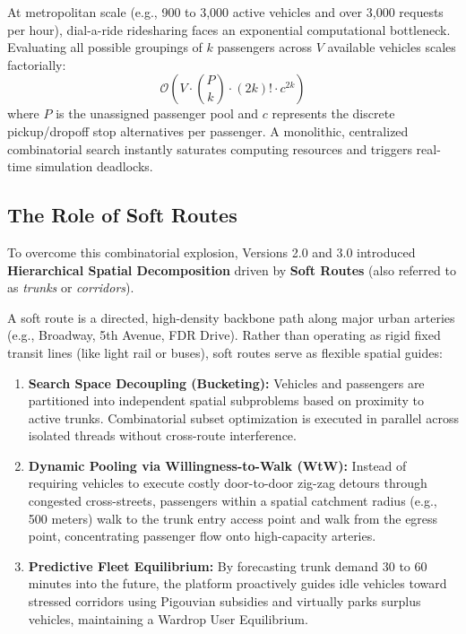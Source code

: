 \documentclass[12pt,a4paper]{article}
\begin{document}
At metropolitan scale (e.g., 900 to 3,000 active vehicles and over 3,000 requests per hour), dial-a-ride ridesharing faces an exponential computational bottleneck. Evaluating all possible groupings of $k$ passengers across $V$ available vehicles scales factorially:
\begin{equation}
\mathcal{O}\left(V \cdot \binom{P}{k} \cdot (2k)! \cdot c^{2k}\right)
\end{equation}
where $P$ is the unassigned passenger pool and $c$ represents the discrete pickup/dropoff stop alternatives per passenger. A monolithic, centralized combinatorial search instantly saturates computing resources and triggers real-time simulation deadlocks.

\subsection{The Role of Soft Routes}
To overcome this combinatorial explosion, Versions 2.0 and 3.0 introduced \textbf{Hierarchical Spatial Decomposition} driven by \textbf{Soft Routes} (also referred to as \textit{trunks} or \textit{corridors}). 

A soft route is a directed, high-density backbone path along major urban arteries (e.g., Broadway, 5th Avenue, FDR Drive). Rather than operating as rigid fixed transit lines (like light rail or buses), soft routes serve as flexible spatial guides:
\begin{enumerate}[label=(\alph*)]
    \item \textbf{Search Space Decoupling (Bucketing):} Vehicles and passengers are partitioned into independent spatial subproblems based on proximity to active trunks. Combinatorial subset optimization is executed in parallel across isolated threads without cross-route interference.
    \item \textbf{Dynamic Pooling via Willingness-to-Walk (WtW):} Instead of requiring vehicles to execute costly door-to-door zig-zag detours through congested cross-streets, passengers within a spatial catchment radius (e.g., 500 meters) walk to the trunk entry access point and walk from the egress point, concentrating passenger flow onto high-capacity arteries.
    \item \textbf{Predictive Fleet Equilibrium:} By forecasting trunk demand 30 to 60 minutes into the future, the platform proactively guides idle vehicles toward stressed corridors using Pigouvian subsidies and virtually parks surplus vehicles, maintaining a Wardrop User Equilibrium.
\end{enumerate}
\end{document}
